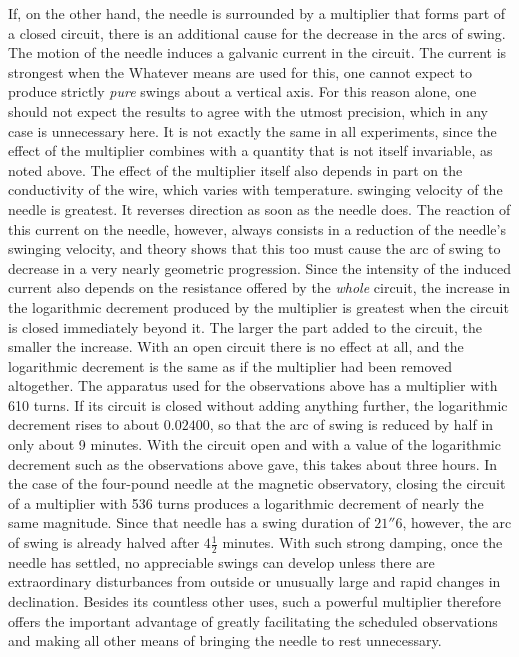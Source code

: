 If, on the other hand, the needle is surrounded by a multiplier that forms part of a closed circuit, there is an additional cause for the decrease in the arcs of swing. The motion of the needle induces a galvanic current in the circuit. The current is strongest when the
\expandafter\def\csname HistoricalNoteText393\endcsname{Whatever means are used for this, one cannot expect to produce strictly \textit{pure} swings about a vertical axis. For this reason alone, one should not expect the results to agree with the utmost precision, which in any case is unnecessary here.}
\expandafter\def\csname HistoricalNoteText392\endcsname{It is not exactly the same in all experiments, since the effect of the multiplier combines with a quantity that is not itself invariable, as noted above. The effect of the multiplier itself also depends in part on the conductivity of the wire, which varies with temperature.}
swinging velocity of the needle is greatest. It reverses direction as soon as the needle does. The reaction of this current on the needle, however, always consists in a reduction of the needle’s swinging velocity, and theory shows that this too must cause the arc of swing to decrease in a very nearly geometric progression. Since the intensity of the induced current also depends on the resistance offered by the \textit{whole} circuit, the increase in the logarithmic decrement produced by the multiplier is greatest when the circuit is closed immediately beyond it. The larger the part added to the circuit, the smaller the increase. With an open circuit there is no effect at all, and the logarithmic decrement is the same as if the multiplier had been removed altogether. The apparatus used for the observations above has a multiplier with 610 turns. If its circuit is closed without adding anything further, the logarithmic decrement rises to about $0.02400$, so that the arc of swing is reduced by half in only about 9 minutes. With the circuit open and with a value of the logarithmic decrement such as the observations above gave, this takes about three hours. In the case of the four-pound needle at the magnetic observatory, closing the circuit of a multiplier with 536 turns produces a logarithmic decrement of nearly the same magnitude. Since that needle has a swing duration of $21''6$, however, the arc of swing is already halved after $4\tfrac12$ minutes. With such strong damping, once the needle has settled, no appreciable swings can develop unless there are extraordinary disturbances from outside or unusually large and rapid changes in declination. Besides its countless other uses, such a powerful multiplier therefore offers the important advantage of greatly facilitating the scheduled observations and making all other means of bringing the needle to rest unnecessary.

